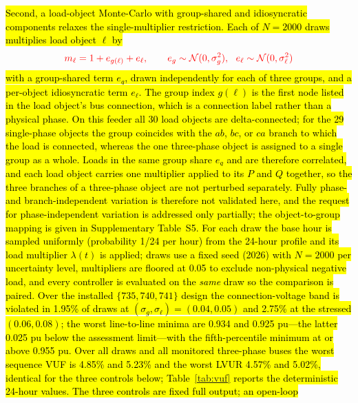 \documentclass{ieeeaccess}
\newcommand{\rev}[1]{{\color{red}\hl{#1}}}
\newcommand{\reveq}[1]{{\color{red}#1}}
\newcommand{\rev}[1]{#1}
\newcommand{\reveq}[1]{#1}
\begin{document}
\rev{Second, a load-object Monte-Carlo with group-shared and idiosyncratic components
relaxes the single-multiplier restriction. Each of \mbox{$N=2000$} draws multiplies load
object \mbox{$\ell$} by}
\begin{equation}
\reveq{m_\ell = 1 + e_{g(\ell)} + e_\ell,\qquad
e_g\sim\mathcal N(0,\sigma_g^2),\ \ e_\ell\sim\mathcal N(0,\sigma_\ell^2)}
\label{eq:mcerr}
\end{equation}
\rev{with a group-shared term \mbox{$e_g$}, drawn independently for each of three groups,
and a per-object idiosyncratic term \mbox{$e_\ell$}. The group index \mbox{$g(\ell)$} is the
first node listed in the load object's bus connection, which is a connection label rather
than a physical phase. On this feeder all 30 load objects are delta-connected; for the 29
single-phase objects the group coincides with the \mbox{$ab$}, \mbox{$bc$}, or \mbox{$ca$}
branch to which the load is connected, whereas the one three-phase object is assigned to a
single group as a whole. Loads in the same group share \mbox{$e_g$} and are therefore
correlated, and each load object carries one multiplier applied to its \mbox{$P$} and
\mbox{$Q$} together, so the three branches of a three-phase object are not perturbed
separately. Fully phase- and branch-independent variation is therefore not validated here,
and the request for phase-independent variation is addressed only partially; the
object-to-group mapping is given in Supplementary Table~S5. For each draw the base hour is
sampled uniformly (probability \mbox{1/24} per hour) from the 24-hour profile and its load
multiplier \mbox{$\lambda(t)$} is applied; draws use a fixed seed (2026) with
\mbox{$N=2000$} per uncertainty level, multipliers are floored at \mbox{0.05} to exclude
non-physical negative load, and every controller is evaluated on the \emph{same} draw so the
comparison is paired. Over the installed \mbox{$\{735,740,741\}$} design the
connection-voltage band is violated in \mbox{1.95\%} of draws at
\mbox{$(\sigma_g,\sigma_\ell)=(0.04,0.05)$} and \mbox{2.75\%} at the stressed
\mbox{$(0.06,0.08)$}; the worst line-to-line minima are \mbox{0.934} and \mbox{0.925}
pu---the latter \mbox{0.025} pu below the assessment limit---with the fifth-percentile
minimum at or above \mbox{0.955} pu. Over all draws and all monitored three-phase buses the
worst sequence VUF is \mbox{4.85\%} and \mbox{5.23\%} and the worst LVUR \mbox{4.57\%} and
\mbox{5.02\%}, identical for the three controls below; Table~\mbox{\ref{tab:vuf}} reports the
deterministic 24-hour values. The three controls are fixed full output; an open-loop
}
\end{document}

